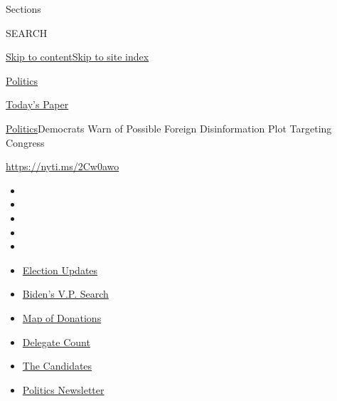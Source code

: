 Sections

SEARCH

\protect\hyperlink{site-content}{Skip to
content}\protect\hyperlink{site-index}{Skip to site index}

\href{https://www.nytimes.com/section/politics}{Politics}

\href{https://myaccount.nytimes.com/auth/login?response_type=cookie\&client_id=vi}{}

\href{https://www.nytimes.com/section/todayspaper}{Today's Paper}

\href{/section/politics}{Politics}\textbar{}Democrats Warn of Possible
Foreign Disinformation Plot Targeting Congress

\url{https://nyti.ms/2Cw0awo}

\begin{itemize}
\item
\item
\item
\item
\item
\end{itemize}

\begin{itemize}
\item
  \href{https://www.nytimes.com/2020/07/31/us/elections/biden-vs-trump.html?action=click\&pgtype=Article\&state=default\&region=TOP_BANNER\&context=storylines_menu}{Election
  Updates}
\item
  \href{https://www.nytimes.com/article/biden-vice-president-2020.html?action=click\&pgtype=Article\&state=default\&region=TOP_BANNER\&context=storylines_menu}{Biden's
  V.P. Search}
\item
  \href{https://www.nytimes.com/interactive/2020/07/24/us/politics/trump-biden-campaign-donors.html?action=click\&pgtype=Article\&state=default\&region=TOP_BANNER\&context=storylines_menu}{Map
  of Donations}
\item
  \href{https://www.nytimes.com/interactive/2020/us/elections/delegate-count-primary-results.html?action=click\&pgtype=Article\&state=default\&region=TOP_BANNER\&context=storylines_menu}{Delegate
  Count}
\item
  \href{https://www.nytimes.com/interactive/2019/us/politics/2020-presidential-candidates.html?action=click\&pgtype=Article\&state=default\&region=TOP_BANNER\&context=storylines_menu}{The
  Candidates}
\item
  \href{https://www.nytimes.com/newsletters/politics?action=click\&pgtype=Article\&state=default\&region=TOP_BANNER\&context=storylines_menu}{Politics
  Newsletter}
\end{itemize}


